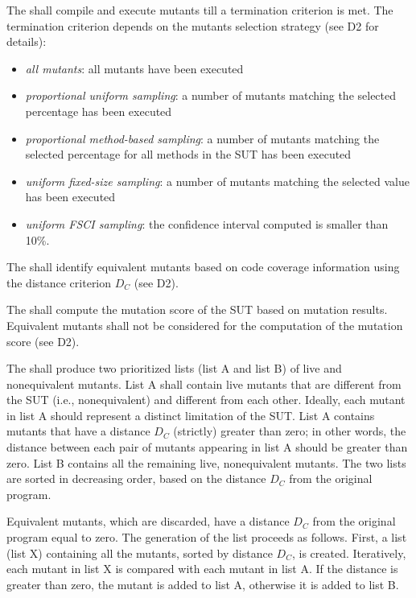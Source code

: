 
\RQ{} The \FAQAS shall compile and execute mutants till a termination criterion is met. The termination criterion depends on the mutants selection strategy (see D2 for details):
\begin{itemize}
	\item \emph{all mutants}: all mutants have been executed
	\item \emph{proportional uniform sampling}: a number of mutants matching the selected percentage has been executed
	\item \emph{proportional method-based sampling}: a number of mutants matching the selected percentage for all methods in the SUT has been executed
	\item \emph{uniform fixed-size sampling}: a number of mutants matching the selected value has been executed
	\item \emph{uniform FSCI sampling}: the confidence interval computed is smaller than 10\%.
\end{itemize}


\RQ{} The \FAQAS shall identify equivalent mutants based on code coverage information using the distance criterion $D_C$ (see D2).


\RQ{} The \FAQAS shall compute the mutation score of the SUT based on mutation results. Equivalent mutants shall not be considered for the computation of the mutation score (see D2).

\RQ{} The \FAQAS shall produce two prioritized lists (list A and list B) of live and nonequivalent mutants.
List A shall contain live mutants that are different from the SUT (i.e., nonequivalent) and different from each other. Ideally, each mutant in list A should represent a distinct limitation of the SUT.
List A contains mutants that have a distance $D_C$ (strictly) greater than zero; in other words, the distance between each pair of mutants appearing in list A should be greater than zero.
List B contains all the remaining live, nonequivalent mutants.
The two lists are sorted in decreasing order, based on the distance $D_C$ from the original program.

\remark Equivalent mutants, which are discarded, have a distance $D_C$ from the original program equal to zero.
The generation of the list proceeds as follows. First, a list (list X) containing all the mutants, sorted by distance $D_C$, is created. Iteratively, each mutant in list X is compared with each mutant in list A. If the distance is greater than zero, the mutant is added to list A, otherwise it is added to list B.


